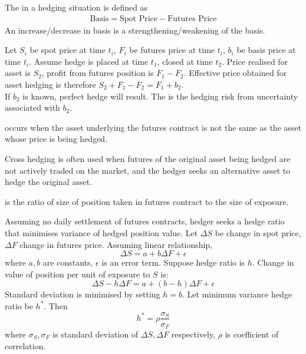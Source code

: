 \begin{definition}
The  in a hedging situation is defined as
\begin{align}
\text{Basis} = \text{Spot Price} - \text{Futures Price} \nonumber
\end{align}
An increase/decrease in basis is a strengthening/weakening of the basis.
\end{definition}

\begin{definition}
Let $S_i$ be spot price at time $t_i$, $F_i$ be futures price at time $t_i$, $b_i$ be basis price at time $t_i$.	 Assume hedge is placed at time $t_1$, closed at time $t_2$. Price realised for asset is $S_2$, profit from futures position is $F_1 - F_2$.  Effective price obtained for asset hedging is therefore $S_2 + F_1 - F_2 = F_1 + b_2$.\\
If $b_2$ is known, perfect hedge will result. The  is the hedging risk from uncertainty associated with $b_2$.
\end{definition}

\begin{definition}
 occurs when the asset underlying the futures contract is not the same as the asset whose price is being hedged.
\end{definition}

Cross hedging is often used when futures of the original asset being hedged are not actively traded on the market, and the hedger seeks an alternative asset to hedge the original asset.

\begin{definition}
 is the ratio of size of position taken in futures contract to the size of exposure.
\end{definition}

Assuming no daily settlement of futures contracts, hedger seeks a hedge ratio that minimises variance of hedged position value. Let $\Delta S$ be change in spot price, $\Delta F$ change in futures price. Assuming linear relationship,
\begin{equation}
\Delta S = a + b \Delta F + \epsilon	 \nonumber
\end{equation}
where $a,b$ are constants, $\epsilon$ is an error term. Suppose hedge ratio is $h$. Change in value of position per unit of exposure to $S$ is:
\begin{equation}
\Delta S - h \Delta F = a + (b-h) \Delta F + \epsilon \nonumber
\end{equation}
Standard deviation is minimised by setting $h=b$. Let minimum variance hedge ratio be $h^*$. Then
\begin{equation}
h^* = \rho \frac{\sigma_S}{\sigma_F} \nonumber
\end{equation}
where $\sigma_S, \sigma_F$ is standard deviation of $\Delta S, \Delta F$ respectively, $\rho$ is coefficient of correlation.

